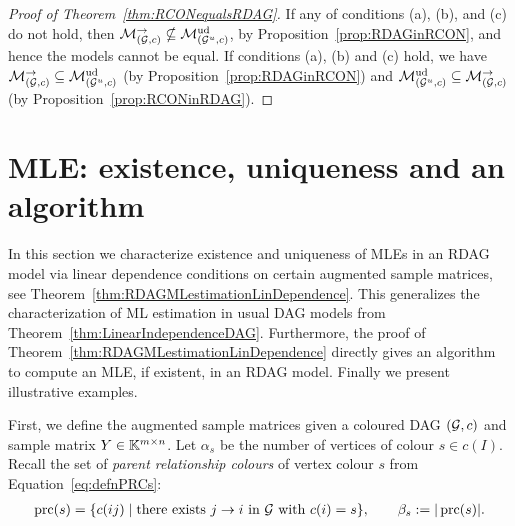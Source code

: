 \begin{proof}[Proof of Theorem~\ref{thm:RCONequalsRDAG}]
	If any of conditions (a), (b), and (c) do not hold, then $\mathcal{M}_{(\mathcal{G}, c)}^{\to} \nsubseteq \mathcal{M}^{\mathrm{ud}}_{(\mathcal{G}^u, c)}$, by Proposition~\ref{prop:RDAGinRCON}, and hence the models cannot be equal. If conditions (a), (b) and (c) hold, we have $\mathcal{M}_{(\mathcal{G}, c)}^{\to} \subseteq \mathcal{M}^{\mathrm{ud}}_{(\mathcal{G}^u, c)}$ (by Proposition~\ref{prop:RDAGinRCON}) and $\mathcal{M}^{\mathrm{ud}}_{(\mathcal{G}^u, c)} \subseteq \mathcal{M}_{(\mathcal{G}, c)}^{\to}$ (by Proposition~\ref{prop:RCONinRDAG}).
\end{proof}


\section{MLE: existence, uniqueness and an algorithm} \label{sec:MLE-RDAG}


In this section we characterize existence and uniqueness of MLEs in an RDAG model via linear dependence conditions on certain augmented sample matrices, see Theorem~\ref{thm:RDAGMLestimationLinDependence}. This generalizes the characterization of ML estimation in usual DAG models from Theorem~\ref{thm:LinearIndependenceDAG}. Furthermore, the proof of Theorem~\ref{thm:RDAGMLestimationLinDependence} directly gives an algorithm to compute an MLE, if existent, in an RDAG model. Finally we present illustrative examples. %

\medskip

First, we define the augmented sample matrices given a coloured DAG $(\mathcal{G}, c)$ and sample matrix $Y \in \mathbb K^{m \times n}$.
Let $\alpha_s$ be the number of vertices of colour $s \in c(I)$. 
Recall the set of \emph{parent relationship colours} of vertex colour $s$ from Equation~\eqref{eq:defnPRCs}:
\begin{align*}
	\operatorname{prc}(s) = \lbrace c(ij) \mid \text{there exists } j \to i \text{ in } \mathcal{G} \text{ with } c(i) = s \rbrace, \qquad \beta_s := \vert \operatorname{prc}(s) \vert.
\end{align*}


